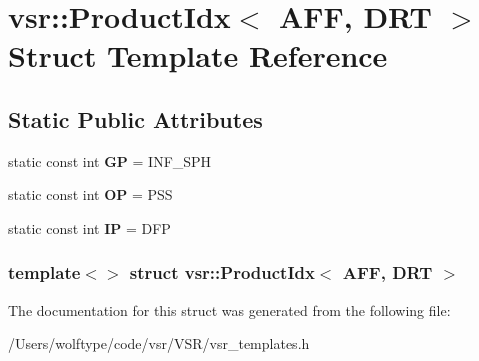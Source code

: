 \hypertarget{structvsr_1_1_product_idx_3_01_a_f_f_00_01_d_r_t_01_4}{\section{vsr\-:\-:Product\-Idx$<$ A\-F\-F, D\-R\-T $>$ Struct Template Reference}
\label{structvsr_1_1_product_idx_3_01_a_f_f_00_01_d_r_t_01_4}
}
\subsection*{Static Public Attributes}
\begin{DoxyCompactItemize}
\item 
\hypertarget{structvsr_1_1_product_idx_3_01_a_f_f_00_01_d_r_t_01_4_a3a9cf8fce5a6bb773cb7534dae379ea6}{static const int {\bfseries G\-P} = I\-N\-F\-\_\-\-S\-P\-H}\label{structvsr_1_1_product_idx_3_01_a_f_f_00_01_d_r_t_01_4_a3a9cf8fce5a6bb773cb7534dae379ea6}

\item 
\hypertarget{structvsr_1_1_product_idx_3_01_a_f_f_00_01_d_r_t_01_4_a192771091d7f046885799f31824e66a7}{static const int {\bfseries O\-P} = P\-S\-S}\label{structvsr_1_1_product_idx_3_01_a_f_f_00_01_d_r_t_01_4_a192771091d7f046885799f31824e66a7}

\item 
\hypertarget{structvsr_1_1_product_idx_3_01_a_f_f_00_01_d_r_t_01_4_a7678d50f3113aa9d4d13189db255e884}{static const int {\bfseries I\-P} = D\-F\-P}\label{structvsr_1_1_product_idx_3_01_a_f_f_00_01_d_r_t_01_4_a7678d50f3113aa9d4d13189db255e884}

\end{DoxyCompactItemize}
\subsubsection*{template$<$$>$ struct vsr\-::\-Product\-Idx$<$ A\-F\-F, D\-R\-T $>$}



The documentation for this struct was generated from the following file\-:\begin{DoxyCompactItemize}
\item 
/\-Users/wolftype/code/vsr/\-V\-S\-R/vsr\-\_\-templates.\-h\end{DoxyCompactItemize}
